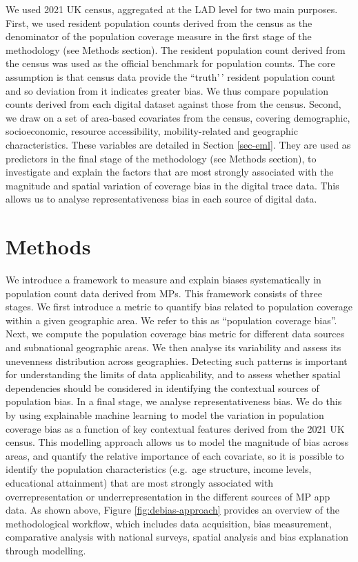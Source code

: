 \documentclass[]{rsos}%
\begin{document}
We used 2021 UK census, aggregated at the LAD level for two main
purposes. First, we used resident population counts derived from the
census as the denominator of the population coverage measure in the
first stage of the methodology (see Methods section). The resident
population count derived from the census was used as the official
benchmark for population counts. The core assumption is that census data
provide the ``truth'\,' resident population count and so deviation from
it indicates greater bias. We thus compare population counts derived
from each digital dataset against those from the census. Second, we draw
on a set of area-based covariates from the census, covering demographic,
socioeconomic, resource accessibility, mobility-related and geographic
characteristics. These variables are detailed in Section \ref{sec-eml}.
They are used as predictors in the final stage of the methodology (see
Methods section), to investigate and explain the factors that are most
strongly associated with the magnitude and spatial variation of coverage
bias in the digital trace data. This allows us to analyse
representativeness bias in each source of digital data.

\section{Methods}\label{methods}

We introduce a framework to measure and explain biases systematically in
population count data derived from MPs. This framework consists of three
stages. We first introduce a metric to quantify bias related to
population coverage within a given geographic area. We refer to this as
``population coverage bias''. Next, we compute the population coverage
bias metric for different data sources and subnational geographic areas.
We then analyse its variability and assess its unevenness distribution
across geographies. Detecting such patterns is important for
understanding the limits of data applicability, and to assess whether
spatial dependencies should be considered in identifying the contextual
sources of population bias. In a final stage, we analyse
representativeness bias. We do this by using explainable machine
learning to model the variation in population coverage bias as a
function of key contextual features derived from the 2021 UK census.
This modelling approach allows us to model the magnitude of bias across
areas, and quantify the relative importance of each covariate, so it is
possible to identify the population characteristics (e.g.~age structure,
income levels, educational attainment) that are most strongly associated
with overrepresentation or underrepresentation in the different sources
of MP app data. As shown above, Figure \ref{fig:debias-approach}
provides an overview of the methodological workflow, which includes data
acquisition, bias measurement, comparative analysis with national
surveys, spatial analysis and bias explanation through modelling.
\end{document}
